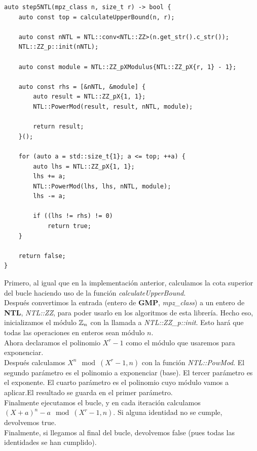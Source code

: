 \begin{lstlisting}
auto step5NTL(mpz_class n, size_t r) -> bool {
	auto const top = calculateUpperBound(n, r);
	
	auto const nNTL = NTL::conv<NTL::ZZ>(n.get_str().c_str());
	NTL::ZZ_p::init(nNTL);
	
	auto const module = NTL::ZZ_pXModulus{NTL::ZZ_pX{r, 1} - 1};
	
	auto const rhs = [&nNTL, &module] {
		auto result = NTL::ZZ_pX{1, 1};
		NTL::PowerMod(result, result, nNTL, module);
		
		return result;
	}();
	
	for (auto a = std::size_t{1}; a <= top; ++a) {
		auto lhs = NTL::ZZ_pX{1, 1};
		lhs += a;
		NTL::PowerMod(lhs, lhs, nNTL, module);
		lhs -= a;
		
		if ((lhs != rhs) != 0)
			return true;
	}
	
	return false;
}
\end{lstlisting}

Primero, al igual que en la implementación anterior, calculamos la cota superior del bucle haciendo uso de la función \textit{calculateUpperBound}.\\

Después convertimos la entrada (entero de \textbf{GMP}, \textit{mpz\_class}) a un entero de \textbf{NTL}, \textit{NTL::ZZ}, para poder usarlo en los algoritmos de esta librería. Hecho eso, inicializamos el módulo $\mathbb{Z}_n$ con la llamada a \textit{NTL::ZZ\_p::init}. Esto hará que todas las operaciones en enteros sean módulo $n$.\\

Ahora declaramos el polinomio $X^r - 1$ como el módulo que usaremos para exponenciar.\\

Después calculamos $X^n \mod(X^r-1, n)$ con la función \textit{NTL::PowMod}. El segundo parámetro es el polinomio a exponenciar (base). El tercer parámetro es el exponente. El cuarto parámetro es el polinomio cuyo módulo vamos a aplicar.El resultado se guarda en el primer parámetro.\\

Finalmente ejecutamos el bucle, y en cada iteración calculamos $(X + a)^n - a \mod(X^r-1, n)$. Si alguna identidad no se cumple, devolvemos true.\\

Finalmente, si llegamos al final del bucle, devolvemos false (pues todas las identidades se han cumplido).\\

